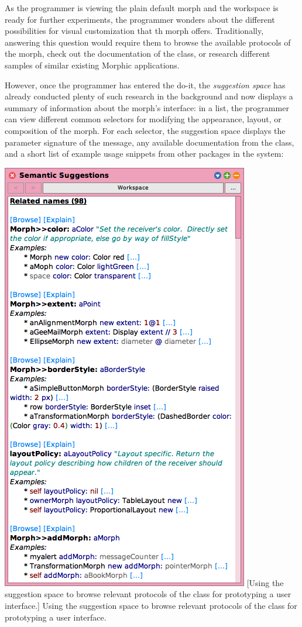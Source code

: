 As the programmer is viewing the plain default morph and the workspace is ready for further experiments, the programmer wonders about the different possibilities for visual customization that th morph offers.
Traditionally, answering this question would require them to browse the available protocols of the morph, check out the documentation of the class, or research different samples of similar existing Morphic applications.

However, once the programmer has entered the do-it, the \emph{suggestion space} has already conducted plenty of such research in the background and now displays a summary of information about the morph's interface:
in a list, the programmer can view different common selectors for modifying the appearance, layout, or composition of the morph.
For each selector, the suggestion space displays the parameter signature of the message, any available documentation from the  class, and a short list of example usage snippets from other packages in the system:

\begin{center}
	\includegraphics[height=30\baselineskip]{01_suggestions/suggestion_space.png} %
	[Using the suggestion space to browse relevant protocols of the class  for prototyping a user interface.]{
		Using the suggestion space to browse relevant protocols of the class  for prototyping a user interface.
	}
\end{center}

